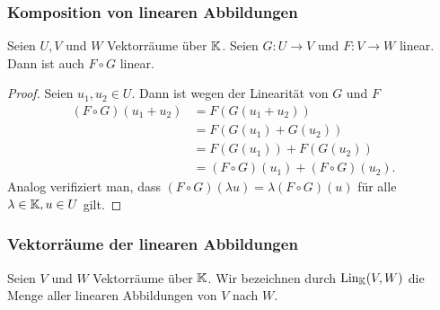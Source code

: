 \subsubsection{Komposition von linearen Abbildungen}

\begin{propn}
	Seien $ U, V $ und $ W $ Vektorräume über $ \mathbb K $. Seien $ G : U \to V $ und $ F : V \to W $ linear. Dann ist auch $ F \circ G $ linear.
\end{propn}
\begin{proof}
	Seien $ u_1, u_2 \in U $. Dann ist wegen der Linearität von $ G $ und $ F $
	\begin{align*}
		(F \circ G)(u_1+u_2) &= F(G(u_1+u_2)) \\
		&= F(G(u_1)+G(u_2)) \\
		&= F(G(u_1))+F(G(u_2)) \\
		&= (F \circ G)(u_1) + (F \circ G)(u_2).
	\end{align*}
	Analog verifiziert man, dass $ (F \circ G)(\lambda u) = \lambda (F \circ G)(u) $ für alle $ \lambda \in \mathbb K, u \in U $ gilt.
\end{proof}

\subsubsection{Vektorräume der linearen Abbildungen}

Seien $ V$ und $ W $ Vektorräume über $ \mathbb K $. Wir bezeichnen durch $ \operatorname{Lin}_\mathbb K(V,W) $ die Menge aller linearen Abbildungen von $ V $ nach $ W $.

